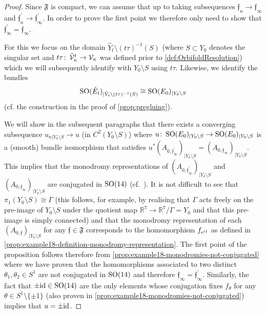 \documentclass[11pt,a4paper]{scrartcl}
\newcommand{\col}{\colon \thinspace}
\newcommand{\e}{\textup{e}}
\newcommand{\id}{\textup{id}}
\newcommand{\SO}{\textup{SO}}
\numberwithin{equation}{section}
\theoremstyle{plain}
\theoremstyle{definition}
\theoremstyle{remark}
\begin{document}
\begin{proof}
Since $\mathfrak{F}$ is compact, we can assume that up to taking subsequences $\mathfrak{f}_n \to \mathfrak{f}_\infty$ and $\mathfrak{f}_n^\prime \to \mathfrak{f}_\infty^\prime$. In order to prove the first point we therefore only need to show that $\mathfrak{f}_\infty^\prime = \mathfrak{f}_\infty$.

For this we focus on the domain $\hat{Y}_t\setminus (t\tau)^{-1}(S)$ (where $S\subset Y_0$ denotes the singular set and $t\tau \col \hat{\mathcal{V}}_\kappa^t \to \mathcal{V}_\kappa$ was defined prior to \autoref{def:OrbifoldResolution}) which we will subsequently identify with $Y_0 \setminus S$ using $t\tau$. Likewise, we identify the bundles \[\SO(\hat{E}_{t})_{\vert \hat{Y}_t \setminus (t\tau)^{-1}(S)} \cong \SO(E_0)_{\vert Y_0 \setminus S}\] (cf. the construction in the proof of \autoref{prop:pregluing}). 

We will show in the subsequent paragraphs that there exists a converging subsequence $u_{n \vert Y_0\setminus S} \to u$ (in $C^2(Y_0\setminus S)$) where $u\col \SO(E_{0})_{\vert Y_0 \setminus S} \to \SO(E_{0})_{\vert Y_0 \setminus S}$ is a (smooth) bundle isomorphism that satisfies $u^*(A_{0, \mathfrak{f}_\infty^\prime})_{\vert Y_0 \setminus S} = (A_{0,\mathfrak{f}_\infty})_{\vert Y_0 \setminus S}$. This implies that the monodromy representations of $(A_{0,\mathfrak{f}_\infty^\prime})_{\vert Y_0\setminus S}$ and $(A_{0,\mathfrak{f}_\infty})_{\vert Y_0\setminus S}$ are conjugated in $\SO(14)$ (cf.~\cite[Proposition~2.2.3]{DonaldsonKronheimer}). It is not difficult to see that $\pi_1(Y_0 \setminus  S ) \cong \Gamma$ (this follows, for example, by realising that $\Gamma$ acts freely on the pre-image of $Y_0 \setminus S$ under the quotient map $\mathbb{R}^7 \to \mathbb{R}^7/\Gamma =Y_0$ and that this pre-image is simply connected) and that the monodromy representation of each $(A_{0,\mathfrak{f}})_{\vert Y_0 \setminus S}$ for any $\mathfrak{f} \in \mathfrak{F}$ corresponds to the homomorphism $f_{\e^{i{\mathfrak{f}}}}$ as defined in \autoref{prop:example18-definition-monodromy-representation}. The first point of the proposition follows therefore from \autoref{prop:example18-monodromies-not-conjugated} where we have proven that the homomorphisms associated to two distinct $\theta_1,\theta_2 \in S^1$ are not conjugated in $\SO(14)$ and therefore $\mathfrak{f}_\infty = \mathfrak{f}_\infty^\prime$.  Similarly, the fact that $\pm \id \in \SO(14)$ are the only elements whose conjugation fixes $f_{\theta}$ for any $\theta \in S^1 \setminus \{\pm 1\}$ (also proven in \autoref{prop:example18-monodromies-not-conjugated}) implies that $u= \pm \id$.


\end{proof}
\end{document}
